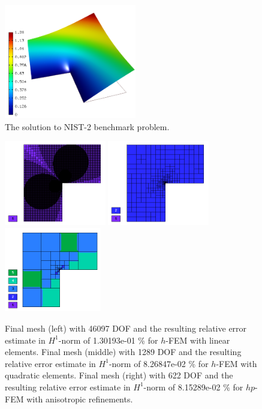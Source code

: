 \documentclass[12pt]{elsarticle}
\begin{document}
\begin{figure}[!ht]
\centering
\includegraphics[height=5cm]{nist/nist-2/solution.png}
\caption{The solution to NIST-2 benchmark problem.}
\label{fig:sln-nist02}
\end{figure}

\begin{figure}[!ht]
\centering
\includegraphics[height=3.7cm]{nist/nist-2/mesh_h1_aniso.png}
\includegraphics[height=3.7cm]{nist/nist-2/mesh_h2_aniso.png}
\includegraphics[height=3.7cm]{nist/nist-2/mesh_hp_aniso.png}
\caption{
Final mesh (left) with 46097 DOF and the resulting
relative error estimate in $H^1$-norm of 1.30193e-01 \% for $h$-FEM with linear elements.
Final mesh (middle) with 1289 DOF and the resulting
relative error estimate in $H^1$-norm of 8.26847e-02 \% for $h$-FEM with quadratic elements.
Final mesh (right) with 622 DOF and the resulting
relative error estimate in $H^1$-norm of 8.15289e-02 \% for $hp$-FEM with anisotropic refinements.}
\label{fig:nist-2-hp-aniso}
\end{figure}
\end{document}
